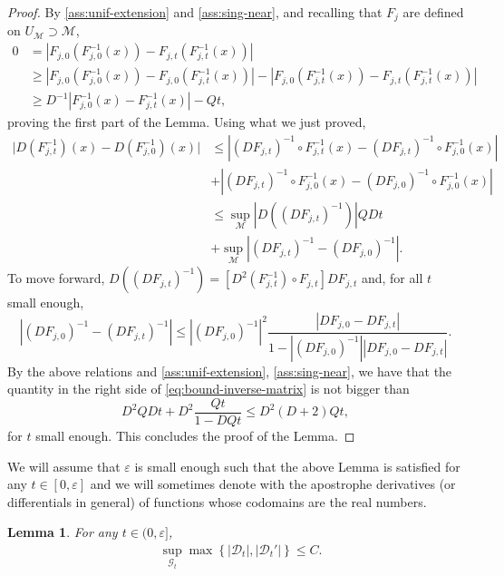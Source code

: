\documentclass{amsart}
\numberwithin{equation}{section}
\newtheorem{lemma}[theorem]{Lemma}
\newcommand\ve{\varepsilon}
\renewcommand{\ge}{\geqslant}
\renewcommand{\le}{\leqslant}
\newcommand\cG{{\mathcal G}}
\newcommand\cM{{\mathcal M}}
\newcommand{\Deriv}{\mathcal D}
\begin{document}
\begin{proof}
By \ref{ass:unif-extension} and \ref{ass:sing-near}, and recalling that \(F_{j}\) are defined on \(U_{\cM} \supset \cM\), 
\[
\begin{split}
0 &= \left|F_{j,0}(F_{j,0}^{-1}(x)) - F_{j,t}(F_{j,t}^{-1}(x)) \right| \\
&\ge  \left|F_{j,0}(F_{j,0}^{-1}(x)) - F_{j,0}(F_{j,t}^{-1}(x))\right| - \left|F_{j,0}(F_{j,t}^{-1}(x))- F_{j,t}(F_{j,t}^{-1}(x)) \right| \\
&\ge  D^{-1} \left|F_{j,0}^{-1}(x)-F_{j,t}^{-1}(x) \right| - Qt,
\end{split}
\]
proving the first part of the Lemma. Using what we just proved,
\begin{equation}\label{eq:bound-inverse-matrix}
\begin{split}
\bigl| D(F_{j,t}^{-1})(x) - D(F_{j,0}^{-1})(x)\bigr| &\le \left| (DF_{j,t})^{-1} \circ F_{j,t}^{-1}(x) - (DF_{j,t})^{-1} \circ F_{j,0}^{-1}(x) \right|\\
&+  \left| (DF_{j,t})^{-1} \circ F_{j,0}^{-1}(x) - (DF_{j,0})^{-1} \circ F_{j,0}^{-1}(x)\right|\\
&\le \sup_{\cM}\left| D((DF_{j,t})^{-1})\right| QDt \\
&+ \sup_{\cM}\left|(DF_{j,t})^{-1} -(DF_{j,0})^{-1}\right|.
\end{split}
\end{equation}
To move forward, \( D((DF_{j,t})^{-1}) = [D^2(F_{j,t}^{-1})\circ F_{j,t}] DF_{j,t} \) and, for all \(t\) small enough,
\[
\left|(DF_{j,0})^{-1}- (DF_{j,t})^{-1} \right| \le \left|(DF_{j,0})^{-1}\right|^2 \frac{\left|DF_{j,0} - DF_{j,t}\right|}{1- \left| (DF_{j,0})^{-1}\right|\left|DF_{j,0} - DF_{j,t}\right|}.
\]
By the above relations and \ref{ass:unif-extension}, \ref{ass:sing-near}, we have that the quantity in the right side of \eqref{eq:bound-inverse-matrix} is not bigger than
\[
D^2 QD t+ D^2\frac{ Qt}{1-DQt} \le D^2(D+2)Qt,
\]
for \(t\) small enough. This concludes the proof of the Lemma.
\end{proof}
We will assume that \(\ve\) is small enough such that the above Lemma is satisfied for any \(t \in [0,\ve]\) and we will sometimes denote with the apostrophe derivatives (or differentials in general) of functions whose codomains are the real numbers.
\begin{lemma}\label{lem:single-perturbed-preimage-invariant-measure}
 For any \(t \in (0, \ve]\), 
  \[
    \begin{split}
  &\sup_{\cG_t}\max\left\{\bigl| \Deriv_t\bigr|, \bigl|\Deriv_t'\bigr|  \right\}  \le C.
    \end{split}
  \]
\end{lemma}
\end{document}
